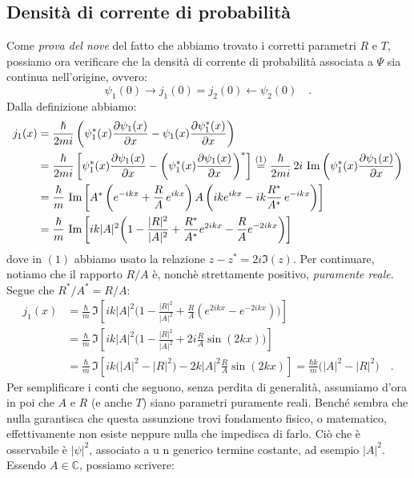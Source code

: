 \subsection{Densità di corrente di probabilità}
Come \emph{prova del nove} del fatto che abbiamo trovato i corretti parametri $R$ e $T$, possiamo ora verificare che la densità di corrente di probabilità associata a $\Psi$ sia continua nell'origine, ovvero:
\[
    \psi_1(0) \rightarrow j_1(0) = j_2(0) \leftarrow \psi_2(0) \quad.
\]
Dalla definizione abbiamo:
\[
\begin{aligned}
    j_1(x) &= \frac{\hbar}{2mi}\left( \psi_1^*(x)\pdv{\psi_1(x)}{x} - \psi_1(x)\pdv{\psi_1^*(x)}{x} \right) \\
    &= \frac{\hbar}{2mi}\left[ \psi_1^*(x)\pdv{\psi_1(x)}{x} - \bigg(\psi_1^*(x)\pdv{\psi_1(x)}{x} \bigg)^*\right] \overset{(1)}{=} \frac{\hbar}{2mi} \, 2i \, \operatorname{Im}\left( \psi_1^*(x)\pdv{\psi_1(x)}{x} \right) \\
    &= \frac{\hbar}{m} \,\operatorname{Im}\left[ A^*\left( e^{-ikx}+\frac{R}{A}\,e^{ikx} \right) A \left( ike^{ikx}-ik\frac{R^*}{A^*}\,e^{-ikx} \right)  \right] \\
    &= \frac{\hbar}{m} \,\operatorname{Im}\left[ ik|A|^2\bigg(1 - \frac{|R|^2}{|A|^2}+ \frac{R^*}{A^*}e^{2ikx} - \frac{R}{A}e^{-2ikx}
    \bigg)  \right]
\end{aligned}
\]
dove in $(1)$ abbiamo usato la relazione $z-z^* = 2i \Im(z)$. Per continuare, notiamo che il rapporto $R/A$ è, nonchè strettamente positivo, \emph{puramente reale}. Segue che $R^*/A^* = R/A$:
\[
    \begin{aligned}
    j_1(x) &= \frac{\hbar}{m} \,\Im\left[ ik|A|^2\bigg(1 - \frac{|R|^2}{|A|^2}+ \frac{R}{A}\left(e^{2ikx} - e^{-2ikx}
    \right)\bigg)  \right] \\
    &= \frac{\hbar}{m} \,\Im\left[ ik|A|^2\bigg(1 - \frac{|R|^2}{|A|^2}+ 2i\frac{R}{A}\sin(2kx)\bigg)  \right]\\
    &= \frac{\hbar}{m} \,\Im\left[ ik\big(|A|^2 - {|R|^2}\big)  -2k|A|^2\frac{R}{A}\sin(2kx)  \right] = \frac{\hbar k}{m} \big(|A|^2 - {|R|^2}\big) \quad.
\end{aligned}
\]
Per semplificare i conti che seguono, senza perdita di generalità, assumiamo d'ora in poi che $A$ e $R$ (e anche $T$) siano parametri puramente reali. Benché sembra che nulla garantisca che questa assunzione trovi fondamento fisico, o matematico, effettivamente non esiste neppure nulla che impedisca di farlo. Ciò che è osservabile è $|\psi|^2$, associato a u n generico termine costante, ad esempio $|A|^2$. Essendo $A \in \mathbb{C}$, possiamo scrivere:
